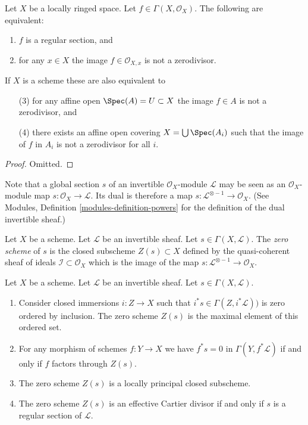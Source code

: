 \begin{lemma}
\label{lemma-regular-section-structure-sheaf}
Let $X$ be a locally ringed space. Let $f \in \Gamma(X, \mathcal{O}_X)$.
The following are equivalent:
\begin{enumerate}
\item $f$ is a regular section, and
\item for any $x \in X$ the image $f \in \mathcal{O}_{X, x}$
is not a zerodivisor.
\end{enumerate}
If $X$ is a scheme these are also equivalent to
\begin{enumerate}
\item[(3)] for any affine open $\Spec(A) = U \subset X$
the image $f \in A$ is not a zerodivisor, and
\item[(4)] there exists an affine open covering
$X = \bigcup \Spec(A_i)$ such that
the image of $f$ in $A_i$ is not a zerodivisor for all $i$.
\end{enumerate}
\end{lemma}

\begin{proof}
Omitted.
\end{proof}

\noindent
Note that a global section $s$ of an invertible $\mathcal{O}_X$-module
$\mathcal{L}$ may be seen as an $\mathcal{O}_X$-module map
$s : \mathcal{O}_X \to \mathcal{L}$. Its dual is therefore a
map $s : \mathcal{L}^{\otimes -1} \to \mathcal{O}_X$.
(See Modules, Definition \ref{modules-definition-powers}
for the definition of the dual invertible sheaf.)

\begin{definition}
\label{definition-zero-scheme-s}
Let $X$ be a scheme.
Let $\mathcal{L}$ be an invertible sheaf.
Let $s \in \Gamma(X, \mathcal{L})$.
The {\it zero scheme} of $s$ is the closed subscheme $Z(s) \subset X$
defined by the quasi-coherent sheaf of ideals
$\mathcal{I} \subset \mathcal{O}_X$ which is the image of the
map $s : \mathcal{L}^{\otimes -1} \to \mathcal{O}_X$.
\end{definition}

\begin{lemma}
\label{lemma-zero-scheme}
Let $X$ be a scheme.
Let $\mathcal{L}$ be an invertible sheaf.
Let $s \in \Gamma(X, \mathcal{L})$.
\begin{enumerate}
\item Consider closed immersions $i : Z \to X$ such that
$i^*s \in \Gamma(Z, i^*\mathcal{L}))$ is zero
ordered by inclusion. The zero scheme $Z(s)$ is the
maximal element of this ordered set.
\item For any morphism of schemes $f : Y \to X$ we have
$f^*s = 0$ in $\Gamma(Y, f^*\mathcal{L})$ if and only if
$f$ factors through $Z(s)$.
\item The zero scheme $Z(s)$ is a locally principal closed subscheme.
\item The zero scheme $Z(s)$ is an effective Cartier divisor
if and only if $s$ is a regular section of $\mathcal{L}$.
\end{enumerate}
\end{lemma}

